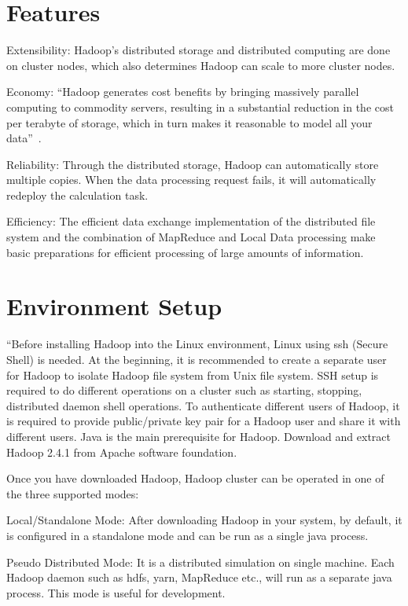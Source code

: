 \section{Features}
Extensibility: Hadoop's distributed storage and distributed computing are done on 
cluster nodes, which also determines Hadoop can scale to more cluster nodes.

Economy: ``Hadoop generates cost benefits by bringing massively parallel computing 
to commodity servers, resulting in a substantial reduction in the cost per terabyte 
of storage, which in turn makes it reasonable to model all your data''~\cite{hid-sp18-508-features}.

Reliability: Through the distributed storage, Hadoop can automatically store multiple 
copies. When the data processing request fails, it will automatically redeploy the 
calculation task.

Efficiency: The efficient data exchange implementation of the distributed file system 
and the combination of MapReduce and Local Data processing make basic preparations 
for efficient processing of large amounts of information.


\section{Environment Setup}
``Before installing Hadoop into the Linux environment,  Linux using ssh (Secure Shell) 
is needed. At the beginning, it is recommended to create a separate user for Hadoop 
to isolate Hadoop file system from Unix file system. SSH setup is required to do 
different operations on a cluster such as starting, stopping, distributed daemon 
shell operations. To authenticate different users of Hadoop, it is required to 
provide public/private key pair for a Hadoop user and share it with different 
users. Java is the main prerequisite for Hadoop. Download and extract Hadoop 2.4.1 
from Apache software foundation. 

Once you have downloaded Hadoop, Hadoop cluster can be operated in one of the 
three supported modes:

Local/Standalone Mode: After downloading Hadoop in your system, by default, 
it is configured in a standalone mode and can be run as a single java process.

Pseudo Distributed Mode: It is a distributed simulation on single machine. 
Each Hadoop daemon such as hdfs, yarn, MapReduce etc., will run as a separate 
java process. This mode is useful for development.


